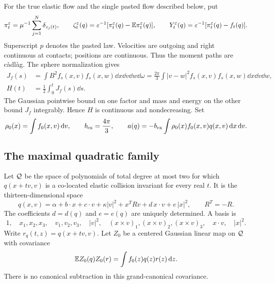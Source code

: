 For the true elastic flow and the single pasted flow described below, put
\begin{equation}\label{eq:fields}
 \pi_t^\varepsilon=\mu^{-1}\sum_{j=1}^N\delta_{z_j(t)},\qquad
 \zeta_t^\varepsilon(q)=\varepsilon^{-1}[\pi_t^\varepsilon(q)-\mathbb E\pi_t^\varepsilon(q)],\qquad
 Y_t^\varepsilon(q)=\varepsilon^{-1}[\pi_t^\varepsilon(q)-f_t(q)].
\end{equation}
Superscript $p$ denotes the pasted law. Velocities are outgoing and right
continuous at contacts; positions are continuous. Thus the moment paths are
c\`adl\`ag. The sphere normalization gives
\begin{equation}\label{eq:drift}
 \begin{split}
 J_f(s)&=\int B^2 f_s(x,v)f_s(x,w)\dd x\dd v\dd w\dd\omega
       =\frac{2\pi}{3}\int |v-w|^2 f_s(x,v)f_s(x,w)\dd x\dd v\dd w,\\
 H(t)&=\frac12\int_0^t J_f(s)\dd s.
 \end{split}
\end{equation}
The Gaussian pointwise bound on one factor and mass and energy on the other
bound $J_f$ integrably. Hence $H$ is continuous and nondecreasing.
Set
\begin{equation}\label{eq:bias}
 \rho_0(x)=\int f_0(x,v)\,\mathrm d v,\qquad b_{\rm ex}=\frac{4\pi}{3},\qquad
 a(q)=-b_{\rm ex}\int\rho_0(x)f_0(x,v)q(x,v)\,\mathrm d x\,\mathrm d v.
\end{equation}

\subsection{The maximal quadratic family}
Let $\mathcal Q$ be the space of polynomials of total degree at most two for which
$q(x+tv,v)$ is a co-located elastic collision invariant for every real $t$.
It is the thirteen-dimensional space
\begin{equation}\label{eq:Q}
 q(x,v)=\alpha+b\cdot x+c\cdot v+\kappa|v|^2+x^T Rv
                         +d\,x\cdot v+e\,|x|^2,\qquad R^T=-R.
\end{equation}
The coefficients $d=d(q)$ and $e=e(q)$ are uniquely determined. A basis is
\begin{equation}\label{eq:basis}
 1,\quad x_1,x_2,x_3,\quad v_1,v_2,v_3,\quad |v|^2,
 \quad (x\times v)_1,(x\times v)_2,(x\times v)_3,
 \quad x\cdot v,\quad |x|^2.
\end{equation}
Write $r_q(t,z)=q(x+tv,v)$. Let $Z_0$ be a centered Gaussian linear map on
$\mathcal Q$ with covariance
\begin{equation}\label{eq:initial-cov}
 \mathbb E Z_0(q)Z_0(r)=\int f_0(z)q(z)r(z)\,\mathrm d z.
\end{equation}
There is no canonical subtraction in this grand-canonical covariance.

